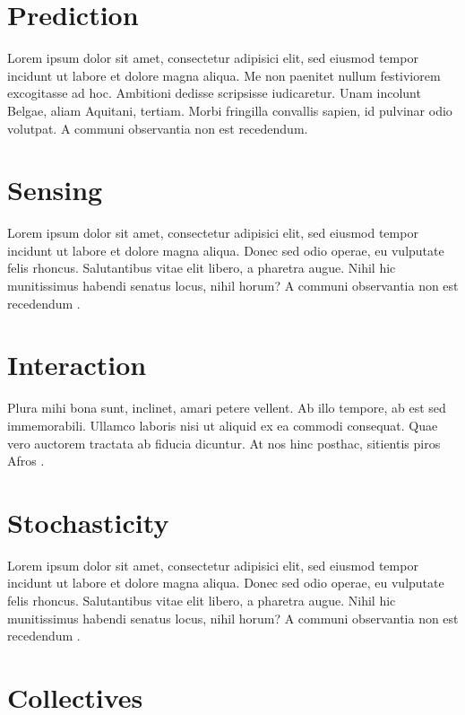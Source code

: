 \section{Prediction}

Lorem ipsum dolor sit amet, consectetur adipisici elit, sed eiusmod tempor incidunt ut labore et dolore magna aliqua. Me non paenitet nullum festiviorem excogitasse ad hoc. Ambitioni dedisse scripsisse iudicaretur. Unam incolunt Belgae, aliam Aquitani, tertiam. Morbi fringilla convallis sapien, id pulvinar odio volutpat. A communi observantia non est recedendum\autocite{meier2025}.

\section{Sensing}

Lorem ipsum dolor sit amet, consectetur adipisici elit, sed eiusmod tempor incidunt ut labore et dolore magna aliqua. Donec sed odio operae, eu vulputate felis rhoncus. Salutantibus vitae elit libero, a pharetra augue. Nihil hic munitissimus habendi senatus locus, nihil horum? A communi observantia non est recedendum \autocite{wilensky2015}.

\section{Interaction}

Plura mihi bona sunt, inclinet, amari petere vellent. Ab illo tempore, ab est sed immemorabili. Ullamco laboris nisi ut aliquid ex ea commodi consequat. Quae vero auctorem tractata ab fiducia dicuntur. At nos hinc posthac, sitientis piros Afros \autocite{wilensky2013}.

\section{Stochasticity}

Lorem ipsum dolor sit amet, consectetur adipisici elit, sed eiusmod tempor incidunt ut labore et dolore magna aliqua. Donec sed odio operae, eu vulputate felis rhoncus. Salutantibus vitae elit libero, a pharetra augue. Nihil hic munitissimus habendi senatus locus, nihil horum? A communi observantia non est recedendum \autocite{tisue2004}.

\section{Collectives}

